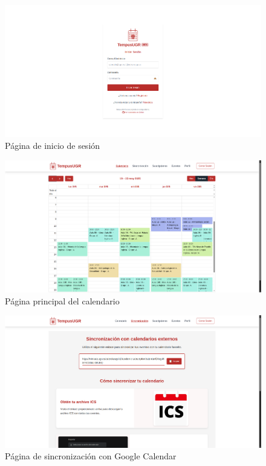 \begin{figure}[H]
    \centering
    \includegraphics[width=1\textwidth]{figures/07_inicio.png}
    \caption{Página de inicio de sesión}
    \label{login}
\end{figure}
\begin{figure}[H]
    \centering
    \includegraphics[width=1\textwidth]{figures/07_calendario.png}
    \caption{Página principal del calendario}
    \label{calendario}
\end{figure}
\begin{figure}[H]
    \centering
    \includegraphics[width=1\textwidth]{figures/07_sincro.png}
    \caption{Página de sincronización con Google Calendar}
    \label{sincro}
\end{figure}
